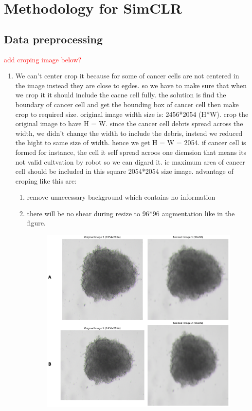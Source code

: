 \chapter{Methodology for SimCLR}\label{ch: Methodology for SimCLR}

\section{Data preprocessing} \label{sec:data preprocessing}
\textcolor{red}{add croping image below?} 
\begin{enumerate}
  
  \item  We can't center crop it because for some of cancer cells are not centered in the image instead they are close to egdes. so we have to make 
  sure that when we crop it it should include the cacne cell fully. the solution is find the boundary of cancer cell and get the bounding box of cancer 
  cell then make crop to required size. original image width size is: 2456*2054 (H*W). crop the original image to have H = W. since the cancer cell debris
   spread across the width, we didn't change the width to include the debris,
   instead we reduced the hight to same size of width. hence we get H = W = 2054. if cancer cell is formed for instance, the cell it self spread acroos
    one diemsion that means its not valid cultvation by robot so we can digard it. ie maximum area of cancer cell should be included in this square 
    2054*2054 size image. advantage of croping like this are:
    \begin{enumerate}
      \item  remove unnecessary background which contains no information
      \item  there will be no shear during resize to 96*96 augmentation like in the figure.
      \begin{figure}[H]
        \centering
        \includegraphics[scale=0.46]{figures/long.png} 

\end{figure}
\end{enumerate}
\end{enumerate}
